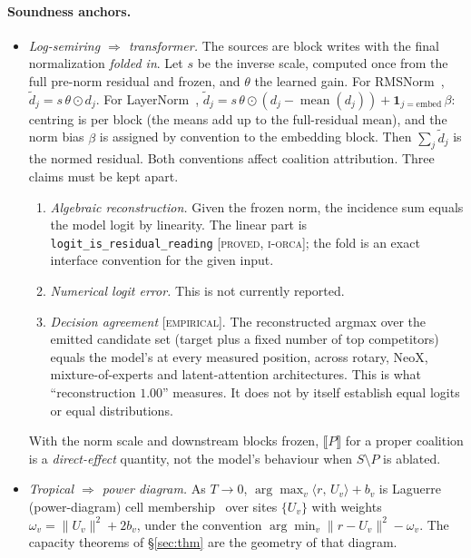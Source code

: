 \documentclass[11pt]{article}
\theoremstyle{definition}
\theoremstyle{plain}
\theoremstyle{remark}
\newcommand{\proved}{\textsc{[proved, i-orca]}}
\newcommand{\empirical}{\textsc{[empirical]}}
\newcommand{\inner}[2]{\langle #1,\, #2\rangle}
\begin{document}
\paragraph{Soundness anchors.}
\begin{itemize}[nosep]
  \item \emph{Log-semiring $\Rightarrow$ transformer.} The sources are block writes with the final
        normalization \emph{folded in}. Let $s$ be the inverse scale, computed once from the full
        pre-norm residual and frozen, and $\theta$ the learned gain. For RMSNorm~\cite{zhang2019root}, $\tilde d_j=s\,\theta\odot d_j$.
        For LayerNorm~\cite{ba2016layer}, $\tilde d_j=s\,\theta\odot(d_j-\operatorname{mean}(d_j))+\mathbf 1_{j=\mathrm{embed}}\,\beta$:
        centring is per block (the means add up to the full-residual mean), and the norm bias $\beta$ is
        assigned by convention to the embedding block. Then $\sum_j\tilde d_j$ is the normed residual. Both
        conventions affect coalition attribution. Three claims must be kept apart.
        \begin{enumerate}[nosep]
          \item \emph{Algebraic reconstruction.} Given the frozen norm, the incidence sum equals the model
                logit by linearity. The linear part is \texttt{logit\_is\_residual\_reading} \proved{}; the
                fold is an exact interface convention for the given input.
          \item \emph{Numerical logit error.} This is not currently reported.
          \item \emph{Decision agreement} \empirical{}. The reconstructed argmax over the emitted candidate
                set (target plus a fixed number of top competitors) equals the model's at every measured position,
                across rotary, NeoX, mixture-of-experts and latent-attention architectures. This is what
                ``reconstruction $1.00$'' measures. It does not by itself establish equal logits or equal
                distributions.
        \end{enumerate}
        With the norm scale and downstream blocks frozen, $\llbracket P\rrbracket$ for a proper coalition is
        a \emph{direct-effect} quantity, not the model's behaviour when $S\setminus P$ is ablated.
  \item \emph{Tropical $\Rightarrow$ power diagram.} As $T\to0$, $\arg\max_v \inner{r}{U_v}+b_v$ is
        Laguerre (power-diagram) cell membership~\cite{aurenhammer1987power} over sites $\{U_v\}$ with weights
        $\omega_v=\lVert U_v\rVert^2+2b_v$, under the convention
        $\arg\min_v\lVert r-U_v\rVert^2-\omega_v$. The capacity theorems of \S\ref{sec:thm} are the geometry
        of that diagram.
\end{itemize}
\end{document}
